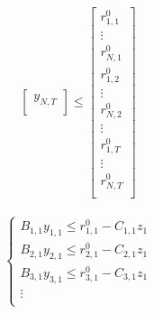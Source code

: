 \documentclass[11pt]{article} %
\begin{document}
\begin{align}
\begin{bmatrix}
        y_{N,T} \\
    \end{bmatrix} \leq
    \begin{bmatrix}
        r_{1,1}^0\\
        \vdots \\
        r_{N,1}^0\\
        r_{1,2}^0\\
        \vdots \\
        r_{N,2}^0\\
        \vdots \\
        r_{1,T}^0\\
        \vdots \\
        r_{N,T}^0\\
    \end{bmatrix}
\end{align}



\begin{align}
    \begin{cases}
         B_{1,1} y_{1,1} \leq r_{1,1}^0 - C_{1,1} z_1\\
         B_{2,1} y_{2,1} \leq r_{2,1}^0 - C_{2,1} z_1\\
         B_{3,1} y_{3,1} \leq r_{3,1}^0 - C_{3,1} z_1\\
        \vdots \\
    \end{cases}
\end{align}
\end{document}
